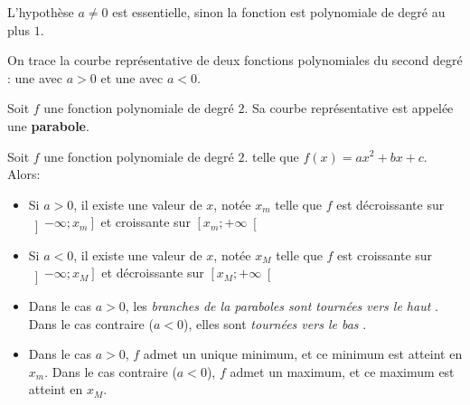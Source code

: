 \documentclass{poly}
\begin{document}
\begin{remark}
L'hypothèse $a \neq 0$ est essentielle, sinon la fonction est polynomiale de degré au plus $1$.    
\end{remark}

On trace la courbe représentative de deux fonctions polynomiales du second degré : une avec $a > 0$ et une avec $a < 0$.

\begin{minipage}{0.45\textwidth}
\begin{center}
\end{center}   
\end{minipage}
\hfill
\begin{minipage}{0.45\textwidth}
\begin{center}
\end{center}    
\end{minipage}
\vspace*{0.5cm}
\begin{definition}
Soit $f$ une fonction polynomiale de degré $2$. Sa courbe représentative est appelée une \textbf{parabole}.
\end{definition}
\begin{proposition}
Soit $f$ une fonction polynomiale de degré $2$. telle que $f(x) = ax^2 + bx + c$. Alors:
\begin{itemize}
\item Si $a > 0$, il existe une valeur de $x$, notée $x_m$ telle que $f$ est décroissante sur $\left] - \infty; x_m \right]$ et croissante sur $\left[x_m; + \infty \right[$
\item Si $a < 0$, il existe une valeur de $x$, notée $x_M$ telle que $f$ est croissante sur $\left] - \infty; x_M \right]$ et décroissante sur $\left[x_M; + \infty \right[$
\end{itemize}
\end{proposition}
\begin{remark}
\hfill
\begin{itemize}
\item Dans le cas $a > 0$, les \emph{\og branches de la paraboles sont tournées vers le haut \fg}. Dans le cas contraire ($a < 0$), elles sont \emph{\og tournées vers le bas \fg}.
\item Dans le cas $a > 0$, $f$ admet un unique minimum, et ce minimum est atteint en $x_m$. Dans le cas contraire ($a < 0$), $f$ admet un maximum, et ce maximum est atteint en $x_M$. 
\end{itemize}
\end{remark}
\newpage
\end{document}
